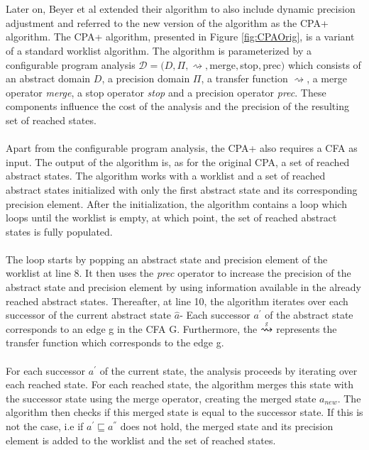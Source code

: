 \documentclass{kththesis}
\newcommand\stackrqarrow[1]{%
    \mathrel{\stackon[2pt]{$\rightsquigarrow$}{$\scriptscriptstyle#1$}}}
\renewcommand{\it}[1]{\textit{#1}}
\begin{document}
\\ \\
Later on, Beyer et al extended their algorithm to also include dynamic precision adjustment and referred to the new version of the algorithm as the CPA+ algorithm\cite{cpaPlusAlgo}. The CPA+ algorithm, presented in Figure \ref{fig:CPAOrig}, is a variant of a standard worklist algorithm. The algorithm is parameterized by a configurable program analysis $\mathcal{D} = (D,\Pi,\rightsquigarrow,$merge$,$stop$,$prec$)$ which consists of an abstract domain $D$, a precision domain $\Pi$, a transfer function $\rightsquigarrow$, a merge operator \it{merge}, a stop operator \it{stop} and a precision operator \it{prec}. These components influence the cost of the analysis and the precision of the resulting set of reached states.
\\ \\
Apart from the configurable program analysis, the CPA+ also requires a CFA as input. The output of the algorithm is, as for the original CPA, a set of reached abstract states. The algorithm works with a worklist and a set of reached abstract states initialized with only the first abstract state and its corresponding precision element. After the initialization, the algorithm contains a loop which loops until the worklist is empty, at which point, the set of reached abstract states is fully populated. 
\\ \\
The loop starts by popping an abstract state and precision element of the worklist at line 8. It then uses the \it{prec} operator to increase the precision of the abstract state and precision element by using information available in the already reached abstract states. Thereafter, at line 10, the algorithm iterates over each successor of the current abstract state $\hat{a}$- Each successor $a^{'}$ of the abstract state corresponds to an edge g in the CFA G. Furthermore, the $\stackrqarrow{g}$ represents the transfer function which corresponds to the edge g.
\\ \\
For each successor $a^{'}$ of the current state, the analysis proceeds by iterating over each reached state. For each reached state, the algorithm merges this state with the successor state using the merge operator, creating the merged state $a_{new}$. The algorithm then checks if this merged state is equal to the successor state. If this is not the case, i.e if $a^{'} \sqsubseteq a^{''}$ does not hold, the merged state and its precision element is added to the worklist and the set of reached states.
\end{document}
